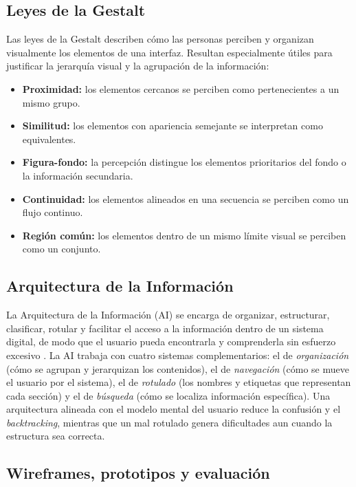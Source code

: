 \subsection{Leyes de la Gestalt}

Las leyes de la Gestalt describen cómo las personas perciben y organizan visualmente los elementos de una interfaz. Resultan especialmente útiles para justificar la jerarquía visual y la agrupación de la información:

\begin{itemize}
  \item \textbf{Proximidad:} los elementos cercanos se perciben como pertenecientes a un mismo grupo.
  \item \textbf{Similitud:} los elementos con apariencia semejante se interpretan como equivalentes.
  \item \textbf{Figura-fondo:} la percepción distingue los elementos prioritarios del fondo o la información secundaria.
  \item \textbf{Continuidad:} los elementos alineados en una secuencia se perciben como un flujo continuo.
  \item \textbf{Región común:} los elementos dentro de un mismo límite visual se perciben como un conjunto.
\end{itemize}

\subsection{Arquitectura de la Información}

La Arquitectura de la Información (AI) se encarga de organizar, estructurar, clasificar, rotular y facilitar el acceso a la información dentro de un sistema digital, de modo que el usuario pueda encontrarla y comprenderla sin esfuerzo excesivo \autocite{rosenfeld2015}. La AI trabaja con cuatro sistemas complementarios: el de \textit{organización} (cómo se agrupan y jerarquizan los contenidos), el de \textit{navegación} (cómo se mueve el usuario por el sistema), el de \textit{rotulado} (los nombres y etiquetas que representan cada sección) y el de \textit{búsqueda} (cómo se localiza información específica). Una arquitectura alineada con el modelo mental del usuario reduce la confusión y el \textit{backtracking}, mientras que un mal rotulado genera dificultades aun cuando la estructura sea correcta.

\subsection{Wireframes, prototipos y evaluación}

